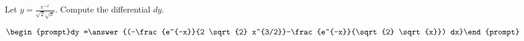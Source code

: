 \documentclass{ximera}
\author{Bart Snapp}
\begin{document}
\begin{exercise}

Let $y= \frac{e^{-x}}{\sqrt{2} \sqrt{x}}$. Compute the differential $dy$.

\[
\begin{prompt}dy =\answer{(-\frac{e^{-x}}{2 \sqrt{2} x^{3/2}}-\frac{e^{-x}}{\sqrt{2} \sqrt{x}}) dx}\end{prompt}
\]
\end{exercise}
\end{document}
